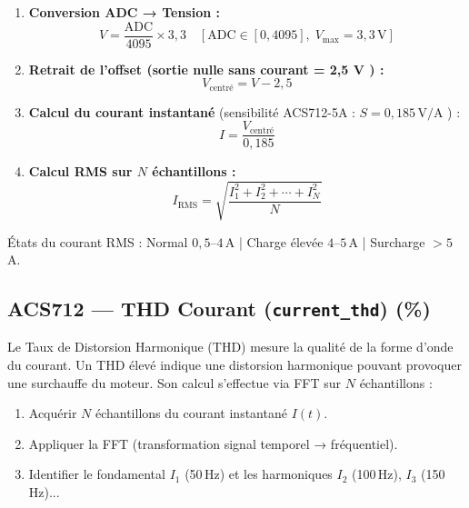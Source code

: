 \documentclass[12pt, a4paper, oneside]{report}
\begin{document}
\begin{enumerate}
  \item \textbf{Conversion ADC → Tension :}
  \begin{equation}
    V = \frac{\text{ADC}}{4095} \times 3{,}3 \quad [\text{ADC} \in [0, 4095],\; V_{\max} = 3{,}3\,\text{V}]
  \end{equation}

  \item \textbf{Retrait de l'offset (sortie nulle sans courant = 2,5 V \cite{acs712}) :}
  \begin{equation}
    V_{\text{centré}} = V - 2{,}5
  \end{equation}

  \item \textbf{Calcul du courant instantané} (sensibilité ACS712-5A : $S = 0{,}185\,\text{V/A}$ \cite{acs712}) :
  \begin{equation}
    I = \frac{V_{\text{centré}}}{0{,}185}
  \end{equation}

  \item \textbf{Calcul RMS sur $N$ échantillons :}
  \begin{equation}
    I_{\text{RMS}} = \sqrt{\frac{I_1^2 + I_2^2 + \cdots + I_N^2}{N}}
  \end{equation}
\end{enumerate}

États du courant RMS : Normal $0{,}5$--$4$\,A | Charge élevée $4$--$5$\,A | Surcharge $> 5$\,A.

\subsection{ACS712 — THD Courant (\texttt{current\_thd}) (\%)}

Le Taux de Distorsion Harmonique (THD) mesure la qualité de la forme d'onde du courant.
Un THD élevé indique une distorsion harmonique pouvant provoquer une surchauffe du moteur.
Son calcul s'effectue via FFT sur $N$ échantillons :

\begin{enumerate}
  \item Acquérir $N$ échantillons du courant instantané $I(t)$.
  \item Appliquer la FFT (transformation signal temporel → fréquentiel).
  \item Identifier le fondamental $I_1$ (50\,Hz) et les harmoniques $I_2$ (100\,Hz), $I_3$ (150\,Hz)...
\end{enumerate}
\end{document}
